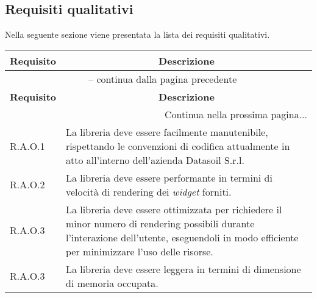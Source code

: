 \subsection{Requisiti qualitativi}
Nella seguente sezione viene presentata la lista dei requisiti qualitativi.

\begin{center}
    \begin{longtable}{|p{2.5cm}|p{10cm}|}
        \hline
        \rowcolor{gray!30}
        \textbf{Requisito} & \multicolumn{1}{c|}{\textbf{Descrizione}}                                                                                            \\
        \hline
        \endfirsthead
        \hline
        \multicolumn{2}{|c|}{{\tablename\ \thetable{} -- continua dalla pagina precedente}}                                                                       \\
        \hline
        \rowcolor{gray!30}
        \textbf{Requisito} & \multicolumn{1}{c|}{\textbf{Descrizione}}                                                                                            \\
        \endhead
        \hline
        \multicolumn{2}{|r|}{{Continua nella prossima pagina...}}                                                                                                 \\
        \hline
        \endfoot
        \hline
        \endlastfoot
        \hline
        R.A.O.1            & La libreria deve essere facilmente manutenibile, rispettando le convenzioni di codifica
        attualmente in atto all'interno dell'azienda Datasoil S.r.l.                                                                                              \\
        \hline
        R.A.O.2            & La libreria deve essere performante in termini di velocità di rendering dei \textit{widget} forniti.                                 \\
        \hline
        R.A.O.3            & La libreria deve essere ottimizzata per richiedere il minor numero di rendering possibili durante l'interazione dell'utente,
        eseguendoli in modo efficiente per minimizzare l'uso delle risorse.                                                                                       \\
        \hline
        R.A.O.3            & La libreria deve essere leggera in termini di dimensione di memoria occupata.                                                        \\

\end{longtable}
\end{center}
